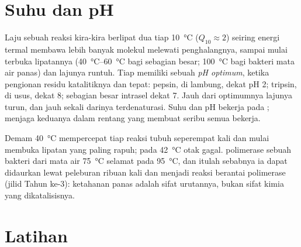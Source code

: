\section{Suhu dan pH}

\begin{proposition}\label{prop:b1:enzymes:environment}
Laju sebuah reaksi  kira-kira berlipat dua tiap
\qty{10}{\celsius} ($Q_{10} \approx 2$) seiring energi termal membawa
lebih banyak molekul melewati penghalangnya, sampai  mulai
terbuka lipatannya (\qtyrange{40}{60}{\celsius} bagi sebagian besar;
\qty{100}{\celsius} bagi  bakteri mata air panas) dan lajunya
runtuh. Tiap  memiliki sebuah \emph{pH optimum}, ketika pengionan
residu katalitiknya dan  tepat: pepsin, di lambung, dekat pH
2; tripsin, di usus, dekat 8; sebagian besar  intrasel dekat 7.
Jauh dari optimumnya lajunya turun, dan jauh sekali darinya 
terdenaturasi. Suhu dan pH bekerja pada ;  menjaga keduanya
dalam rentang yang membuat seribu  semua bekerja.
\end{proposition}

\begin{example}\label{ex:b1:enzymes:fever}
Demam \qty{40}{\celsius} mempercepat tiap reaksi tubuh seperempat kali
dan mulai membuka lipatan  yang paling rapuh; pada
\qty{42}{\celsius}  otak gagal.  polimerase sebuah bakteri
dari mata air \qty{75}{\celsius} selamat pada \qty{95}{\celsius}, dan
itulah sebabnya ia dapat didaurkan lewat peleburan  ribuan kali dan
menjadi  reaksi berantai polimerase (jilid Tahun ke-3):
ketahanan panas adalah sifat urutannya, bukan sifat kimia yang
dikatalisisnya.
\end{example}

\section{Latihan}

